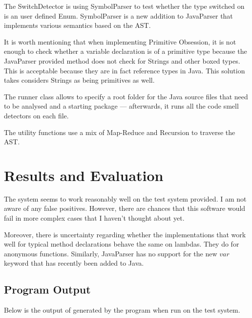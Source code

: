 \documentclass[a4paper]{article}
\begin{document}
The SwitchDetector is using SymbolParser to test whether the type switched on
is an user defined Enum.
SymbolParser is a new addition to JavaParser that implements various semantics
based on the AST.

It is worth mentioning that when implementing Primitive Obsession, it is not
enough to check whether a variable declaration is of a primitive type because
the JavaParser provided method does not check for Strings and other boxed types.
This is acceptable because they are in fact reference types in Java.
This solution takes considers Strings as being primitives as well.

The runner class allows to specify a root folder for the Java source files
that need to be analysed and a starting package --- afterwards, it runs
all the code smell detectors on each file.

The utility functions use a mix of Map-Reduce and Recursion to traverse the AST.

\section{Results and Evaluation}

The system seems to work reasonably well on the test system provided. I am not
aware of any false positives. However, there are chances that this software
would fail in more complex cases that I haven't thought about yet.

Moreover, there is uncertainty regarding whether the implementations that work
well for typical method declarations behave the same on lambdas.
They do for anonymous functions.
Similarly, JavaParser has no support for the new $var$ keyword that has recently
been added to Java.

\subsection{Program Output}
Below is the output of generated by the program when run on the test system.
\end{document}
